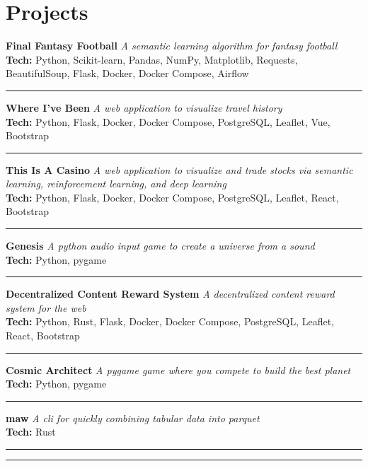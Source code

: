 \documentclass[10pt]{article}%
\newcommand{\projects}[3]{%
    \textbf{#1} \textemdash{} \textit{#2} \\ %
    \textbf{Tech:} #3 %
    \vspace{-1em}
    \begin{center}
        \rule{0.7\textwidth}{0.2pt}
    \end{center}
}
\newcommand{\headerline}{\noindent\rule{\textwidth}{0.4pt}}
\begin{document}
    \section*{\faPuzzlePiece{} Projects}
    \projects{Final Fantasy Football}{A semantic learning algorithm for fantasy football}{Python, Scikit-learn, Pandas, NumPy, Matplotlib, Requests, BeautifulSoup, Flask, Docker, Docker Compose, Airflow}
    \projects{Where I've Been}{A web application to visualize travel history}{Python, Flask, Docker, Docker Compose, PostgreSQL, Leaflet, Vue, Bootstrap}
    \projects{This Is A Casino}{A web application to visualize and trade stocks via semantic learning, reinforcement learning, and deep learning}{Python, Flask, Docker, Docker Compose, PostgreSQL, Leaflet, React, Bootstrap}
    \projects{Genesis}{A python audio input game to create a universe from a sound}{Python, pygame}
    \projects{Decentralized Content Reward System}{A decentralized content reward system for the web}{Python, Rust, Flask, Docker, Docker Compose, PostgreSQL, Leaflet, React, Bootstrap}
    \projects{Cosmic Architect}{A pygame game where you compete to build the best planet}{Python, pygame}
    \projects{maw}{A cli for quickly combining tabular data into parquet}{Rust}
    \headerline
\end{document}
